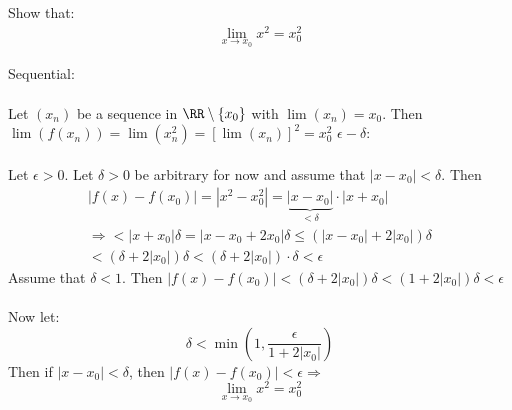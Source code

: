 \documentclass[class=scrartcl, crop=false]{standalone}
\begin{document}
\begin{example}
  Show that:
  \begin{gather*}
    \lim_{x \to x_0}x^2 = x_0^2
  \end{gather*} 
  \begin{soln}
    \begin{enumerate}
      \ii[]
      \ii Sequential:
      \\\\
      Let $(x_n)$ be a sequence in $\RR \setminus \{x_0\}$ with $\lim(x_n) = x_0$. Then $\lim(f(x_n)) = \lim(x_n^2) = [\lim(x_n)]^2 = x_0^2$
      \ii $\epsilon-\delta$:
      \\\\
      Let $\epsilon > 0$. Let $\delta > 0$ be arbitrary for now and assume that $|x - x_0| < \delta$. Then
      \begin{gather*}
        |f(x) - f(x_0)| = |x^2 - x_0^2| = \underbrace{|x - x_0|}_{<\delta} \cdot |x + x_0| \\
        \Rightarrow < |x + x_0| \delta = |x - x_0 + 2x_0| \delta \leq (|x - x_0| + 2|x_0|) \delta \\
        < (\delta + 2|x_0|) \delta < (\delta + 2|x_0|) \cdot \delta < \epsilon
      \end{gather*}
      Assume that $\delta < 1$. Then $|f(x) - f(x_0)| < (\delta + 2|x_0|) \delta < (1 + 2|x_0|) \delta < \epsilon$ 
      \\\\
      Now let: 
      \[
        \delta < \min(1, \frac{\epsilon}{1 + 2|x_0|})
      \]
      Then if $|x - x_0| < \delta$, then $|f(x) - f(x_0)| < \epsilon \Rightarrow$
      \[
        \lim_{x \to x_0} x^2 = x_0^2
      \]
    \end{enumerate} 
  \end{soln} 
\end{example} 
\end{document}
